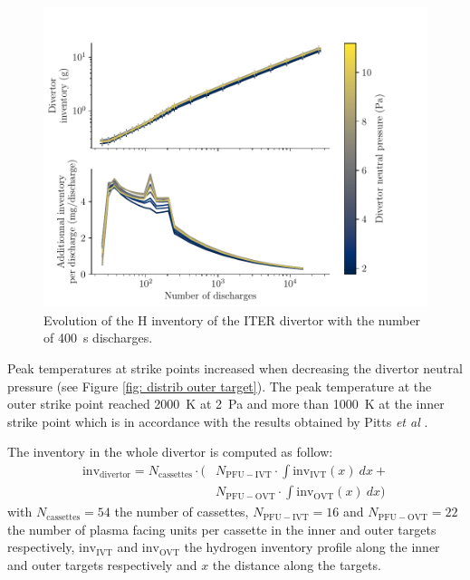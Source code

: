 \begin{figure}[h!]
    \centering
    \includegraphics[width=\linewidth]{Figures/divertor/ITER/inventory_vs_time.pdf}
    \caption{Evolution of the H inventory of the ITER divertor with the number of \SI{400}{s} discharges.}
    \label{fig: iter vs time}
\end{figure}


Peak temperatures at strike points increased when decreasing the divertor neutral pressure (see Figure \ref{fig: distrib outer target}).
The peak temperature at the outer strike point reached \SI{2000}{K} at \SI{2}{Pa} and more than \SI{1000}{K} at the inner strike point which is in accordance with the results obtained by Pitts \textit{et al} .

The inventory in the whole divertor is computed as follow:
\begin{equation}
\begin{split}
    \mathrm{inv_{divertor}} = N_\mathrm{cassettes} \cdot \big(&N_\mathrm{PFU-IVT} \cdot \int \mathrm{inv_{IVT}}(x)\: dx + \\ &N_\mathrm{PFU-OVT} \cdot\int \mathrm{inv_{OVT}}(x) \: dx \big)
\end{split}
\end{equation}
with $N_\mathrm{cassettes}=54$ the number of cassettes, $N_\mathrm{PFU-IVT}=16$ and $N_\mathrm{PFU-OVT}=22$ the number of plasma facing units per cassette in the inner and outer targets respectively, $\mathrm{inv_{IVT}}$ and $\mathrm{inv_{OVT}}$ the hydrogen inventory profile along the inner and outer targets respectively and $x$ the distance along the targets.

